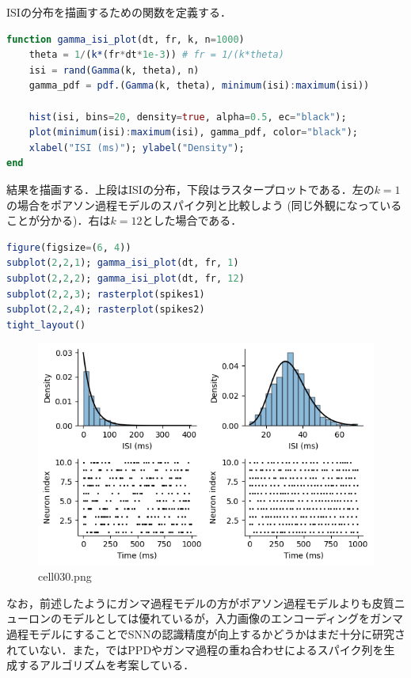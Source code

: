 ISIの分布を描画するための関数を定義する．
\begin{lstlisting}[language=julia]
function gamma_isi_plot(dt, fr, k, n=1000)
    theta = 1/(k*(fr*dt*1e-3)) # fr = 1/(k*theta)
    isi = rand(Gamma(k, theta), n)
    gamma_pdf = pdf.(Gamma(k, theta), minimum(isi):maximum(isi))

    hist(isi, bins=20, density=true, alpha=0.5, ec="black"); 
    plot(minimum(isi):maximum(isi), gamma_pdf, color="black"); 
    xlabel("ISI (ms)"); ylabel("Density");
end
\end{lstlisting}
結果を描画する．上段はISIの分布，下段はラスタープロットである．左の$k=1$の場合をポアソン過程モデルのスパイク列と比較しよう (同じ外観になっていることが分かる)．右は$k=12$とした場合である．
\begin{lstlisting}[language=julia]
figure(figsize=(6, 4))
subplot(2,2,1); gamma_isi_plot(dt, fr, 1)
subplot(2,2,2); gamma_isi_plot(dt, fr, 12)
subplot(2,2,3); rasterplot(spikes1)
subplot(2,2,4); rasterplot(spikes2)
tight_layout()
\end{lstlisting}
\begin{figure}[ht]
	\centering
	\includegraphics[scale=0.8, max width=\linewidth]{./fig/neuron-model/isi/cell030.png}
	\caption{cell030.png}
	\label{cell030.png}
\end{figure}
なお，前述したようにガンマ過程モデルの方がポアソン過程モデルよりも皮質ニューロンのモデルとしては優れているが，入力画像のエンコーディングをガンマ過程モデルにすることでSNNの認識精度が向上するかどうかはまだ十分に研究されていない．また，\citep{Deger2012-ai}ではPPDやガンマ過程の重ね合わせによるスパイク列を生成するアルゴリズムを考案している．
